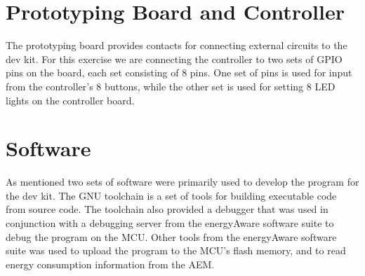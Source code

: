 \section{Prototyping Board and Controller}

The prototyping board provides contacts for connecting external circuits to the
dev kit. For this exercise we are connecting the controller to two sets of GPIO
pins on the board, each set consisting of 8 pins. One set of pins is used for
input from the controller's 8 buttons, while the other set is used for setting 8
LED lights on the controller board.

\section{Software}

As mentioned two sets of software were primarily used to develop the program for
the dev kit. The GNU toolchain is a set of tools for building executable code
from source code. The toolchain also provided a debugger that was used in
conjunction with a debugging server from the energyAware software suite to debug
the program on the MCU. Other tools from the energyAware software suite was used
to upload the program to the MCU's flash memory, and to read energy consumption
information from the AEM.
